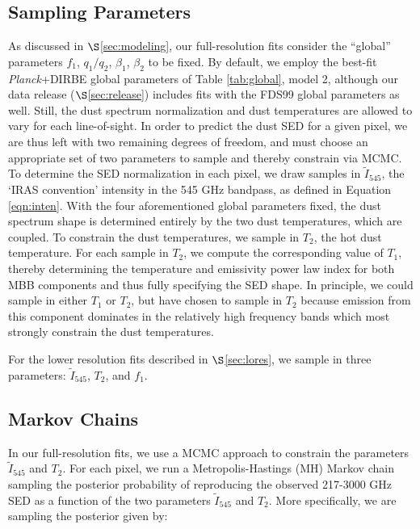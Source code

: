 \documentclass{emulateapj}
\newcommand{\PLANCK}{{\it Planck}}
\begin{document}
\subsection{Sampling Parameters}
\label{sec:samp}
As discussed in $\S$\ref{sec:modeling}, our full-resolution fits
consider the ``global'' parameters $f_1$, $q_1/q_2$, $\beta_1$, $\beta_2$ to be
fixed. By default, we employ the best-fit \PLANCK+DIRBE global parameters of 
Table \ref{tab:global}, model 2, although our data release 
($\S$\ref{sec:release}) includes fits with the FDS99 global parameters as well.
Still,  the dust spectrum normalization and dust temperatures are allowed to 
vary for each line-of-sight. In order to predict the dust SED for a given 
pixel, we are thus left with two remaining degrees of freedom, and must choose 
an appropriate set of two parameters to sample and thereby constrain via MCMC. 
To determine the SED normalization in each pixel, we draw samples in 
$\tilde{I}_{545}$, the `IRAS convention' intensity in the 545 GHz bandpass, as 
defined in Equation \ref{eqn:inten}. With the four aforementioned global 
parameters fixed, the dust spectrum shape is determined entirely by the two 
dust temperatures, which are coupled. To constrain the dust temperatures, we 
sample in $T_2$, the hot dust temperature. For each sample in $T_2$, we compute
the corresponding value of $T_1$, thereby determining the temperature and 
emissivity power law index for both MBB components and thus fully specifying 
the SED shape. In principle, we could sample in either $T_1$ or $T_2$, but have
chosen to sample in $T_2$ because emission from this component dominates in the
relatively high frequency bands which most strongly constrain the dust 
temperatures.

For the lower resolution fits described in $\S$\ref{sec:lores}, we sample
in three parameters: $\tilde{I}_{545}$, $T_2$, and $f_1$.


\subsection{Markov Chains}
\label{sec:mcmc}

In our full-resolution fits, we use a MCMC approach to constrain the 
parameters $\tilde{I}_{545}$ and $T_2$. For each pixel, we run a 
Metropolis-Hastings (MH) Markov chain sampling the posterior probability of
reproducing the observed 217-3000 GHz SED as a function of the two parameters 
$\tilde{I}_{545}$ and $T_2$. More specifically, we are sampling the posterior 
given by:
\end{document}
